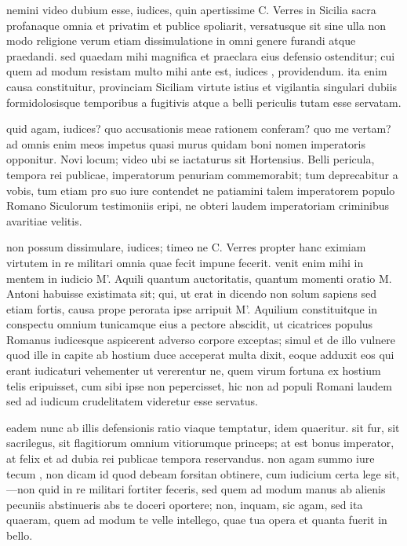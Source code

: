 
 nemini video dubium esse, iudices, quin apertissime C. Verres in Sicilia sacra profanaque omnia et privatim et publice spoliarit, versatusque sit sine ulla non modo religione verum etiam dissimulatione in omni genere furandi atque praedandi. sed quaedam mihi magnifica et praeclara eius defensio ostenditur; cui quem ad modum resistam multo mihi ante est, iudices , providendum. ita enim causa constituitur, provinciam Siciliam virtute istius et vigilantia singulari dubiis formidolosisque temporibus a fugitivis atque a belli periculis tutam esse servatam.

 quid agam, iudices? quo accusationis meae rationem conferam? quo me vertam? ad omnis enim meos impetus quasi murus quidam boni nomen imperatoris opponitur. Novi locum; video ubi se iactaturus sit Hortensius. Belli pericula, tempora rei publicae, imperatorum penuriam commemorabit; tum deprecabitur a vobis, tum etiam pro suo iure contendet ne patiamini talem imperatorem populo Romano Siculorum testimoniis eripi, ne obteri laudem imperatoriam criminibus avaritiae velitis.

 non possum dissimulare, iudices; timeo ne C. Verres propter hanc eximiam virtutem in re militari omnia quae fecit impune fecerit. venit enim mihi in mentem in iudicio M'. Aquili quantum auctoritatis, quantum momenti oratio M. Antoni habuisse existimata sit; qui, ut erat in dicendo non solum sapiens sed etiam fortis, causa prope perorata ipse arripuit M'. Aquilium constituitque in conspectu omnium tunicamque eius a pectore abscidit, ut cicatrices populus Romanus iudicesque aspicerent adverso corpore exceptas; simul et de illo vulnere quod ille in capite ab hostium duce acceperat multa dixit, eoque adduxit eos qui erant iudicaturi vehementer ut vererentur ne, quem virum fortuna ex hostium telis eripuisset, cum sibi ipse non pepercisset, hic non ad populi Romani laudem sed ad iudicum crudelitatem videretur esse servatus.

 eadem nunc ab illis defensionis ratio viaque temptatur, idem quaeritur. sit fur, sit sacrilegus, sit flagitiorum omnium vitiorumque princeps; at est bonus imperator, at felix et ad dubia rei publicae tempora reservandus. non agam summo iure tecum , non dicam id quod debeam forsitan obtinere, cum iudicium certa lege sit,—non quid in re militari fortiter feceris, sed quem ad modum manus ab alienis pecuniis abstinueris abs te doceri oportere; non, inquam, sic agam, sed ita quaeram, quem ad modum te velle intellego, quae tua opera et quanta fuerit in bello.

